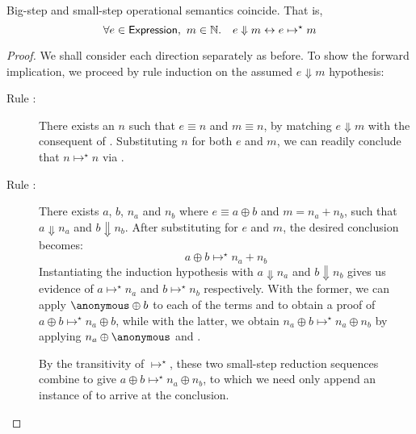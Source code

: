 \begin{theorem}
Big-step and small-step operational semantics coincide. That is,
\[
	\forall e \in \mathsf{Expression},\ m \in \mathbb{N}.\quad
		e \Downarrow m \leftrightarrow e \mapsto^\star m
\]
\end{theorem}
\begin{proof}
We shall consider each direction separately as before. To show the forward
implication, we proceed by rule induction on the assumed $e \Downarrow m$
hypothesis:
\begin{description}
\item[Rule :]%
There exists an $n$ such that $e \equiv n$ and $m \equiv n$, by matching $e
\Downarrow m$ with the consequent of . Substituting $n$ for
both $e$ and $m$, we can readily conclude that $n \mapsto^\star n$ via
.
\item[Rule :]%
There exists $a$, $b$, $n_a$ and $n_b$ where $e \equiv a \oplus b$ and $m
= n_a + n_b$, such that $a \Downarrow n_a$ and $b \Downarrow n_b$. After
substituting for $e$ and $m$, the desired conclusion becomes:
\[
	a \oplus b \mapsto^\star n_a + n_b
\]
Instantiating the induction hypothesis with $a \Downarrow n_a$ and $b
\Downarrow n_b$ gives us evidence of $a \mapsto^\star n_a$ and $b
\mapsto^\star n_b$ respectively. With the former, we can apply $\anonymous
\oplus b$ to each of the terms and  to obtain a proof of
$a \oplus b \mapsto^\star n_a \oplus b$, while with the latter, we obtain
$n_a \oplus b \mapsto^\star n_a \oplus n_b$ by applying $n_a \oplus
\anonymous$ and .

By the transitivity of $\mapsto^\star$, these two small-step reduction
sequences combine to give $a \oplus b \mapsto^\star n_a \oplus n_b$, to
which we need only append an instance of  to arrive at
the conclusion.
\end{description}


\end{proof}
